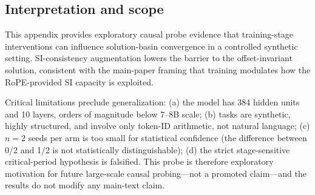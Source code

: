 \documentclass{article}
\begin{document}
\subsection{Interpretation and scope}

This appendix provides exploratory causal probe evidence that training-stage interventions can influence solution-basin convergence in a controlled synthetic setting. SI-consistency augmentation lowers the barrier to the offset-invariant solution, consistent with the main-paper framing that training modulates how the RoPE-provided SI capacity is exploited.

Critical limitations preclude generalization: (a) the model has 384 hidden units and 10 layers, orders of magnitude below 7--8B scale; (b) tasks are synthetic, highly structured, and involve only token-ID arithmetic, not natural language; (c) $n{=}2$ seeds per arm is too small for statistical confidence (the difference between 0/2 and 1/2 is not statistically distinguishable); (d) the strict stage-sensitive critical-period hypothesis is falsified. This probe is therefore exploratory motivation for future large-scale causal probing---not a promoted claim---and the results do not modify any main-text claim.


\newpage

\end{document}
